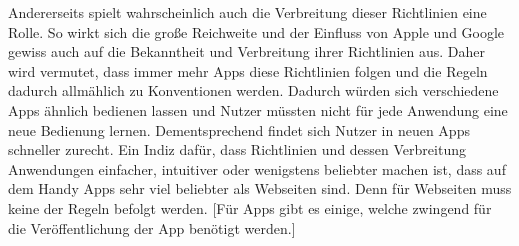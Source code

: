 		Andererseits spielt wahrscheinlich auch die Verbreitung dieser Richtlinien eine Rolle. So wirkt sich die große Reichweite und der Einfluss von Apple und Google gewiss auch auf die Bekanntheit und Verbreitung ihrer Richtlinien aus. %
		Daher wird vermutet, dass immer mehr Apps diese Richtlinien folgen und die Regeln dadurch allmählich zu Konventionen werden. %
		Dadurch würden sich verschiedene Apps ähnlich bedienen lassen und Nutzer müssten nicht für jede Anwendung eine neue Bedienung lernen. Dementsprechend findet sich Nutzer in neuen Apps schneller zurecht.\newline%
		Ein Indiz dafür, dass Richtlinien und dessen Verbreitung Anwendungen einfacher, intuitiver oder wenigstens beliebter machen ist, dass auf dem Handy Apps sehr viel beliebter als Webseiten sind\cite{pcVsphone_mobileAppVsWebTimeSpent}. Denn für Webseiten muss keine der Regeln befolgt werden. [Für Apps gibt es einige, welche zwingend für die Veröffentlichung der App benötigt werden.]














